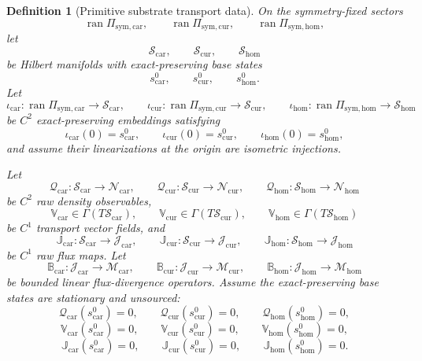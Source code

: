 \documentclass[11pt]{article}
\newcommand{\TensorSymProj}{\Pi_{\mathrm{sym,car}}}
\newcommand{\CurSymProj}{\Pi_{\mathrm{sym,cur}}}
\newcommand{\HomSymProj}{\Pi_{\mathrm{sym,hom}}}
\newcommand{\TensorDensityClass}{\mathscr N_{\mathrm{car}}}
\newcommand{\CurDensityClass}{\mathscr N_{\mathrm{cur}}}
\newcommand{\HomDensityClass}{\mathscr N_{\mathrm{hom}}}
\newcommand{\TensorStateManifold}{\mathcal S_{\mathrm{car}}}
\newcommand{\CurStateManifold}{\mathcal S_{\mathrm{cur}}}
\newcommand{\HomStateManifold}{\mathcal S_{\mathrm{hom}}}
\newcommand{\TensorStateBase}{s_{\mathrm{car}}^{0}}
\newcommand{\CurStateBase}{s_{\mathrm{cur}}^{0}}
\newcommand{\HomStateBase}{s_{\mathrm{hom}}^{0}}
\newcommand{\TensorStateEmbed}{\iota_{\mathrm{car}}}
\newcommand{\CurStateEmbed}{\iota_{\mathrm{cur}}}
\newcommand{\HomStateEmbed}{\iota_{\mathrm{hom}}}
\newcommand{\TensorRawDensity}{\boldsymbol{\mathcal Q}_{\mathrm{car}}}
\newcommand{\CurRawDensity}{\boldsymbol{\mathcal Q}_{\mathrm{cur}}}
\newcommand{\HomRawDensity}{\boldsymbol{\mathcal Q}_{\mathrm{hom}}}
\newcommand{\TensorTransport}{\mathbb V_{\mathrm{car}}}
\newcommand{\CurTransport}{\mathbb V_{\mathrm{cur}}}
\newcommand{\HomTransport}{\mathbb V_{\mathrm{hom}}}
\newcommand{\TensorFluxClass}{\mathscr J_{\mathrm{car}}}
\newcommand{\CurFluxClass}{\mathscr J_{\mathrm{cur}}}
\newcommand{\HomFluxClass}{\mathscr J_{\mathrm{hom}}}
\newcommand{\TensorFlux}{\mathbb J_{\mathrm{car}}}
\newcommand{\CurFlux}{\mathbb J_{\mathrm{cur}}}
\newcommand{\HomFlux}{\mathbb J_{\mathrm{hom}}}
\newcommand{\TensorDiv}{\mathbb B_{\mathrm{car}}}
\newcommand{\CurDiv}{\mathbb B_{\mathrm{cur}}}
\newcommand{\HomDiv}{\mathbb B_{\mathrm{hom}}}
\newtheorem{definition}{Definition}
\begin{document}
\begin{definition}[Primitive substrate transport data]
\label{def:primitive_transport}
On the symmetry-fixed sectors
\[
\operatorname{ran}\TensorSymProj,\qquad
\operatorname{ran}\CurSymProj,\qquad
\operatorname{ran}\HomSymProj,
\]
let
\[
\TensorStateManifold,\qquad
\CurStateManifold,\qquad
\HomStateManifold
\]
be Hilbert manifolds with exact-preserving base states
\[
\TensorStateBase,\qquad
\CurStateBase,\qquad
\HomStateBase.
\]
Let
\[
\TensorStateEmbed:\operatorname{ran}\TensorSymProj\to\TensorStateManifold,\qquad
\CurStateEmbed:\operatorname{ran}\CurSymProj\to\CurStateManifold,\qquad
\HomStateEmbed:\operatorname{ran}\HomSymProj\to\HomStateManifold
\]
be \(C^2\) exact-preserving embeddings satisfying
\begin{equation}
\TensorStateEmbed(0)=\TensorStateBase,\qquad
\CurStateEmbed(0)=\CurStateBase,\qquad
\HomStateEmbed(0)=\HomStateBase,
\label{eq:state_embeddings_at_zero}
\end{equation}
and assume their linearizations at the origin are isometric injections.

Let
\[
\TensorRawDensity:\TensorStateManifold\to\TensorDensityClass,\qquad
\CurRawDensity:\CurStateManifold\to\CurDensityClass,\qquad
\HomRawDensity:\HomStateManifold\to\HomDensityClass
\]
be \(C^2\) raw density observables,
\[
\TensorTransport\in\Gamma(T\TensorStateManifold),\qquad
\CurTransport\in\Gamma(T\CurStateManifold),\qquad
\HomTransport\in\Gamma(T\HomStateManifold)
\]
be \(C^1\) transport vector fields, and
\[
\TensorFlux:\TensorStateManifold\to\TensorFluxClass,\qquad
\CurFlux:\CurStateManifold\to\CurFluxClass,\qquad
\HomFlux:\HomStateManifold\to\HomFluxClass
\]
be \(C^1\) raw flux maps. Let
\[
\TensorDiv:\TensorFluxClass\to\mathscr M_{\mathrm{car}},\qquad
\CurDiv:\CurFluxClass\to\mathscr M_{\mathrm{cur}},\qquad
\HomDiv:\HomFluxClass\to\mathscr M_{\mathrm{hom}}
\]
be bounded linear flux-divergence operators. Assume the exact-preserving base states are stationary and unsourced:
\begin{equation}
\TensorRawDensity(\TensorStateBase)=0,\qquad
\CurRawDensity(\CurStateBase)=0,\qquad
\HomRawDensity(\HomStateBase)=0,
\label{eq:raw_density_zero}
\end{equation}
\begin{equation}
\TensorTransport(\TensorStateBase)=0,\qquad
\CurTransport(\CurStateBase)=0,\qquad
\HomTransport(\HomStateBase)=0,
\label{eq:transport_zero}
\end{equation}
\begin{equation}
\TensorFlux(\TensorStateBase)=0,\qquad
\CurFlux(\CurStateBase)=0,\qquad
\HomFlux(\HomStateBase)=0.
\label{eq:flux_zero}
\end{equation}


\end{definition}
\end{document}
